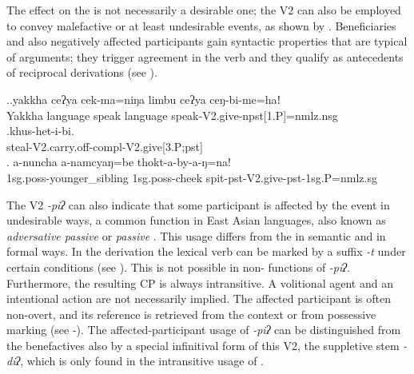 The effect on the  is not necessarily a desirable one; the V2 can also be employed to 
convey malefactive or at least undesirable events, as shown by \Next. Beneficiaries and also negatively affected participants gain syntactic properties that are typical of arguments; they  trigger agreement in the verb and they qualify as antecedents of reciprocal derivations (see ). 
\largerpage

\ex.\ag.yakkha ceʔya cek-ma=niŋa limbu ceʔya ceŋ-bi-me=haǃ\\
Yakkha language  speak  language speak{\sc -V2.give-npst[1.P]=nmlz.nsg}\\
\bg.khus-het-i-bi.\\
steal{\sc -V2.carry.off-compl-V2.give[3.P;pst]}\\
\bg. a-nuncha a-namcyaŋ=be thokt-a-by-a-ŋ=na!\\
{\sc 1sg.poss-}younger\_sibling {\sc 1sg.poss-}cheek  spit{\sc -pst-V2.give-pst-1sg.P=nmlz.sg}\\


The   V2 \emph{-piʔ}  can also indicate that some participant is affected by the event in undesirable ways, a common function in East Asian languages, also known as \emph{adversative passive} or \emph{ passive} \citep{Keenanetal2007Passives, Yapetal1998_give}. This usage differs from the  in semantic and in formal ways.  In the  derivation the lexical verb can be marked by a suffix \emph{-t} under certain conditions (see ). This is not possible in non- functions of  \emph{-piʔ}.  Furthermore, the resulting CP is always intransitive. A volitional agent  and an intentional action are not necessarily implied. The affected participant is often non-overt, and its reference is retrieved from the context or from possessive marking (see \Next[c]-\Next[d]). The affected-participant usage of \emph{-piʔ} can be distinguished from the benefactives also by a special infinitival form of this V2, the suppletive stem \emph{-diʔ}, which is only found in the intransitive usage of . 

